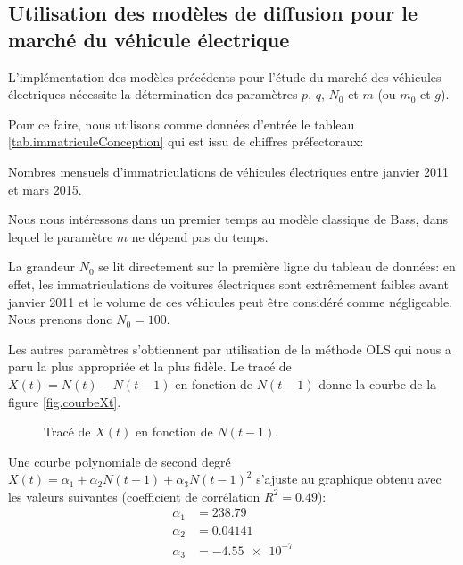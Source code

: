 	\subsection{Utilisation des modèles de diffusion pour le marché du véhicule électrique}

		L'implémentation des modèles précédents pour l'étude du marché des véhicules électriques nécessite la détermination des paramètres $p$, $q$, $N_0$ et $m$ (ou $m_0$ et $g$).

		Pour ce faire, nous utilisons comme données d'entrée le tableau \vref{tab.immatriculeConception} qui est issu de chiffres préfectoraux:
	
		\begin{table}[!h]
			\centering
			\caption{Nombres mensuels d'immatriculations de véhicules électriques entre janvier 2011 et mars 2015. \label{tab.immatriculeConception}}
		\end{table}

		Nous nous intéressons dans un premier temps au modèle classique de Bass, dans lequel le paramètre $m$ ne dépend pas du temps.

		La grandeur $N_0$ se lit directement sur la première ligne du tableau de données: en effet, les immatriculations de voitures électriques sont extrêmement faibles avant janvier 2011 et le volume de ces véhicules peut être considéré comme négligeable. Nous prenons donc $N_0 = 100$.

		Les autres paramètres s'obtiennent par utilisation de la méthode OLS qui nous a paru la plus appropriée et la plus fidèle. Le tracé de $X(t) = N(t) - N(t-1)$ en fonction de $N(t-1)$ donne la courbe de la figure \vref{fig.courbeXt}.
		
		\begin{figure}[!h]
			\centering
			\caption{Tracé de $X(t)$ en fonction de $N(t-1)$.\label{fig.courbeXt}}
		\end{figure}
		
		Une courbe polynomiale de second degré $X(t) = \alpha_1 + \alpha_2 N(t-1) + \alpha_3 N(t-1)^2$ s'ajuste au graphique obtenu avec les valeurs suivantes (coefficient de corrélation $R^2 = \num{0.49}$):
		\begin{align*}
			\alpha_1 &= \num{238.79}\\
			\alpha_2 &= \num{0.04141}\\
			\alpha_3 &= \num{-4.55e-7}
		\end{align*}

